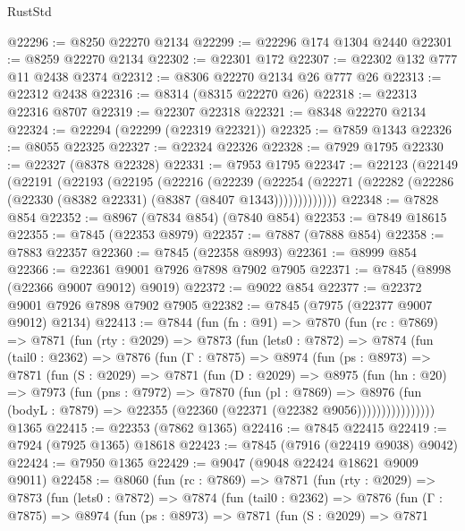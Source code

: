\begin{lexlean}{RustStd}
\begin{coremodule}
@22296 := @8250 @22270 @2134
@22299 := @22296 @174 @1304 @2440
@22301 := @8259 @22270 @2134
@22302 := @22301 @172
@22307 := @22302 @132 @777 @11 @2438 @2374
@22312 := @8306 @22270 @2134 @26 @777 @26
@22313 := @22312 @2438
@22316 := @8314 (@8315 @22270 @26)
@22318 := @22313 @22316 @8707
@22319 := @22307 @22318
@22321 := @8348 @22270 @2134
@22324 := @22294 (@22299 (@22319 @22321))
@22325 := @7859 @1343
@22326 := @8055 @22325
@22327 := @22324 @22326
@22328 := @7929 @1795
@22330 := @22327 (@8378 @22328)
@22331 := @7953 @1795
@22347 := @22123
    (@22149
      (@22191
        (@22193
          (@22195
            (@22216
              (@22239
                (@22254
                  (@22271 (@22282 (@22286 (@22330 (@8382 @22331) (@8387 (@8407 @1343)))))))))))))
@22348 := @7828 @854
@22352 := @8967 (@7834 @854) (@7840 @854)
@22353 := @7849 @18615
@22355 := @7845 (@22353 @8979)
@22357 := @7887 (@7888 @854)
@22358 := @7883 @22357
@22360 := @7845 (@22358 @8993)
@22361 := @8999 @854
@22366 := @22361 @9001 @7926 @7898 @7902 @7905
@22371 := @7845 (@8998 (@22366 @9007 @9012) @9019)
@22372 := @9022 @854
@22377 := @22372 @9001 @7926 @7898 @7902 @7905
@22382 := @7845 (@7975 (@22377 @9007 @9012) @2134)
@22413 := @7844
    (fun (fn : @91) =>
    @7870
      (fun (rc : @7869) =>
      @7871
        (fun (rty : @2029) =>
        @7873
          (fun (lets0 : @7872) =>
          @7874
            (fun (tail0 : @2362) =>
            @7876
              (fun (Γ : @7875) =>
              @8974
                (fun (ps : @8973) =>
                @7871
                  (fun (S : @2029) =>
                  @7871
                    (fun (D : @2029) =>
                    @8975
                      (fun (hn : @20) =>
                      @7973
                        (fun (pns : @7972) =>
                        @7870
                          (fun (pl : @7869) =>
                          @8976
                            (fun (bodyL : @7879) =>
                            @22355 (@22360 (@22371 (@22382 @9056))))))))))))))))
    @1365
@22415 := @22353 (@7862 @1365)
@22416 := @7845 @22415
@22419 := @7924 (@7925 @1365) @18618
@22423 := @7845 (@7916 (@22419 @9038) @9042)
@22424 := @7950 @1365
@22429 := @9047 (@9048 @22424 @18621 @9009 @9011)
@22458 := @8060
    (fun (rc : @7869) =>
    @7871
      (fun (rty : @2029) =>
      @7873
        (fun (lets0 : @7872) =>
        @7874
          (fun (tail0 : @2362) =>
          @7876
            (fun (Γ : @7875) =>
            @8974
              (fun (ps : @8973) =>
              @7871
                (fun (S : @2029) =>
                @7871

\end{coremodule}
\end{lexlean}
